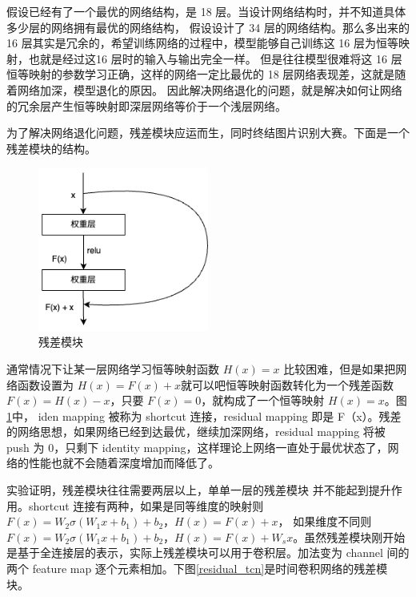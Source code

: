 假设已经有了一个最优的网络结构，是 18 层。当设计网络结构时，并不知道具体多少层的网络拥有最优的网络结构，
假设设计了 34 层的网络结构。那么多出来的 16 层其实是冗余的，希望训练网络的过程中，模型能够自己训练这 16 层为恒等映射，也就是经过这16 层时的输入与输出完全一样。
但是往往模型很难将这 16 层恒等映射的参数学习正确，这样的网络一定比最优的 18 层网络表现差，这就是随着网络加深，模型退化的原因。
因此解决网络退化的问题，就是解决如何让网络的冗余层产生恒等映射即深层网络等价于一个浅层网络。

为了解决网络退化问题，残差模块应运而生，同时终结图片识别大赛。下面是一个残差模块的结构。

\begin{figure}[htbp]
  \centering
  \includegraphics[width=0.5\textwidth]{figures/residual_block.drawio.png}
  \caption{残差模块}
  \label{residual_block}
\end{figure}

通常情况下让某一层网络学习恒等映射函数 $H(x) = x$ 比较困难，但是如果把网络函数设置为 $H(x) = F(x) + x$就可以吧恒等映射函数转化为一个残差函数 $F(x) = H(x) - x$，只要 $F(x) = 0$，就构成了一个恒等映射 $H(x) = x$。图\ref{residual_block}中，
iden mapping 被称为 shortcut 连接，residual mapping 即是 F（x）。残差的网络思想，如果网络已经到达最优，继续加深网络，residual mapping 将被 push 为 0，只剩下 identity mapping，这样理论上网络一直处于最优状态了，网络的性能也就不会随着深度增加而降低了。

实验证明，残差模块往往需要两层以上，单单一层的残差模块 并不能起到提升作用\cite{he2016deep}。shortcut 连接有两种，如果是同等维度的映射则 $F(x)=W_2σ(W_1x+b_1)+b_2，H(x)=F(x)+x$，
如果维度不同则 $F(x)=W_2σ(W_1x+b_1)+b_2，H(x)=F(x)+W_sx$。虽然残差模块刚开始是基于全连接层的表示，实际上残差模块可以用于卷积层。加法变为 channel 间的两个 feature map 逐个元素相加。下图\ref{residual_tcn}是时间卷积网络的残差模块。

